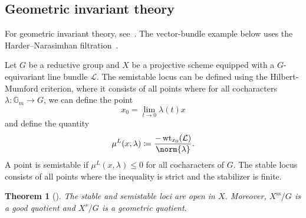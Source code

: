 \documentclass{amsart}
\newtheorem{thm}{Theorem}[section]
\theoremstyle{definition}
\theoremstyle{remark}
\theoremstyle{plain}
\theoremstyle{definition}
\theoremstyle{remark}
\newcommand{\G}{\mathbb{G}}
\newcommand{\mc}[1]{\mathcal{#1}}
\newcommand{\on}[1]{\operatorname{#1}}
\newcommand{\1}{\mathbf{1}}
\newcommand{\2}{\mathbf{2}}
\newcommand{\3}{\mathbf{3}}
\begin{document}
\subsection{Geometric invariant theory}%
\label{sub:Geometric invariant theory}

For geometric invariant theory, see~\cite{MFK1994}. The vector-bundle example below uses the Harder--Narasimhan filtration~\cite{HN1975}.

Let \(G\) be a reductive group and \(X\) be a projective scheme equipped with a \(G\)-equivariant line bundle \(\mc{L}\). The semistable locus can be defined using the Hilbert-Mumford criterion, where it consists of all points where for all cocharacters
\(\lambda \colon \G_m \to G\), we can define the point 
\[ x_0 = \lim_{t \to 0} \lambda(t) x \]
and define the quantity
\[ \mu^L(x, \lambda) \coloneqq \frac{-\on{wt}_{x_0}(\mc{L})}{\norm{\lambda}}. \]
A point is semistable if \(\mu^L(x, \lambda) \leq 0\) for all cocharacters of \(G\). The stable locus consists of all points where the inequality is strict and the stabilizer is finite.

\begin{thm}[{\cite{MFK1994}}]
    The stable and semistable loci are open in \(X\). Moreover, \(X^{\on{ss}}/G\) is a good quotient and \(X^s/G\) is a geometric quotient.  
\end{thm}
\end{document}
